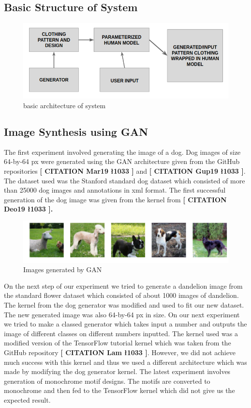 \documentclass{article}
\begin{document}
    \subsection{Basic Structure of System}
        \begin{figure}[h]
            \centering
            \includegraphics[scale=0.75]{images/basicArchitecture.png}
            \caption{basic architecture of system}
        \end{figure}
     
    
    \subsection{Image Synthesis using GAN}
    
    The first experiment involved generating the image of a dog. Dog images of size 64-by-64 px were generated using the GAN architecture given from the GitHub repositories \textbf{[ CITATION Mar19 \l 1033 ]} and \textbf{[ CITATION Gup19 \l 1033 ]}. The dataset used was the Stanford standard dog dataset which consisted of more than 25000 dog images and annotations in xml format. The first successful generation of the dog image was given from the kernel from \textbf{[ CITATION Deo19 \l 1033 ].}
    
    \begin{figure}[h]
        \centering
        \includegraphics[scale=0.5]{images/dogGAN.png}
        \caption{Images generated by GAN}
        \label{fig:my_label}
    \end{figure}
    On the next step of our experiment we tried to generate a dandelion image from the standard flower dataset which consisted of about 1000 images of dandelion. The kernel from the dog generator was modified and used to fit our new dataset. The new generated image was also 64-by-64 px in size.
    On our next experiment we tried to make a classed generator which takes input a number and outputs the image of different classes on different numbers inputted. The kernel used was a modified version of the TensorFlow tutorial kernel which was taken from the GitHub repository \textbf{[ CITATION Lam \l 1033 ]}. However, we did not achieve much success with this kernel and thus we used a different architecture which was made by modifying the dog generator kernel.
    The latest experiment involves generation of monochrome motif designs. The motifs are converted to monochrome and then fed to the TensorFlow kernel which did not give us the expected result.
    
\end{document}
